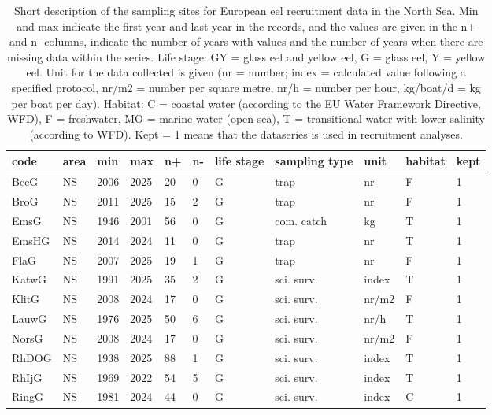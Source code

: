 \begin{table}[ht]
\centering
\caption{Short description of the sampling sites for European eel recruitment data in the North Sea. Min and max indicate the first year and last year in the records, and the values are given in the n+ and n- columns, indicate the number of years with values and the number of years when there are missing data within the series. Life stage: GY = glass eel and yellow eel, G = glass eel, Y = yellow eel. Unit for the data collected is given (nr = number; index = calculated value following a specified protocol, nr/m2 = number per square metre, nr/h = number per hour, kg/boat/d = kg per boat per day). Habitat: C = coastal water (according to the EU Water Framework Directive, WFD), F = freshwater, MO = marine water (open sea), T = transitional water with lower salinity (according to WFD). Kept = 1 means that the dataseries is used in recruitment analyses.} 
\label{statseriesG}
\begin{tabular}{p{1cm}p{1cm}p{1cm}p{1cm}p{0.8cm}p{0.8cm}p{1cm}p{2cm}p{2cm}p{1cm}p{1cm}}
  \hline
code & area & min & max & n+ & n- & life stage & sampling type & unit & habitat & kept \\ 
  \hline
BeeG & NS & 2006 & 2025 & 20 & 0 & G & trap & nr & F & 1 \\ 
  BroG & NS & 2011 & 2025 & 15 & 2 & G & trap & nr & F & 1 \\ 
  EmsG & NS & 1946 & 2001 & 56 & 0 & G & com. catch & kg & T & 1 \\ 
  EmsHG & NS & 2014 & 2024 & 11 & 0 & G & trap & nr & T & 1 \\ 
  FlaG & NS & 2007 & 2025 & 19 & 1 & G & trap & nr & F & 1 \\ 
  KatwG & NS & 1991 & 2025 & 35 & 2 & G & sci. surv. & index & T & 1 \\ 
  KlitG & NS & 2008 & 2024 & 17 & 0 & G & sci. surv. & nr/m2 & F & 1 \\ 
  LauwG & NS & 1976 & 2025 & 50 & 6 & G & sci. surv. & nr/h & T & 1 \\ 
  NorsG & NS & 2008 & 2024 & 17 & 0 & G & sci. surv. & nr/m2 & F & 1 \\ 
  RhDOG & NS & 1938 & 2025 & 88 & 1 & G & sci. surv. & index & T & 1 \\ 
  RhIjG & NS & 1969 & 2022 & 54 & 5 & G & sci. surv. & index & T & 1 \\ 
  RingG & NS & 1981 & 2024 & 44 & 0 & G & sci. surv. & index & C & 1 \\ 

\end{tabular}
\end{table}
